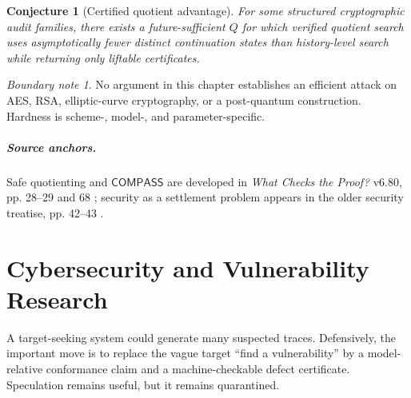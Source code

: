 \documentclass[11pt,oneside]{book}
\newtheorem{conjecture}[theorem]{Conjecture}
\theoremstyle{definition}
\theoremstyle{remark}
\newtheorem{boundary}[theorem]{Boundary note}
\newcommand{\COMPASS}{\mathsf{COMPASS}}
\begin{document}
\begin{conjecture}[Certified quotient advantage]
For some structured cryptographic audit families, there exists a future-sufficient \(Q\) for which
verified quotient search uses asymptotically fewer distinct continuation states than history-level
search while returning only liftable certificates.
\end{conjecture}

\begin{boundary}
No argument in this chapter establishes an efficient attack on AES, RSA, elliptic-curve cryptography,
or a post-quantum construction. Hardness is scheme-, model-, and parameter-specific.
\end{boundary}

\paragraph{Source anchors.} Safe quotienting and \(\COMPASS\) are developed in
\emph{What Checks the Proof?} v6.80, pp. 28--29 and 68 \cite{TennesonChecks}; security as a
settlement problem appears in the older security treatise, pp. 42--43 \cite{TennesonSecurity}.

\chapter{Cybersecurity and Vulnerability Research}
\label{ch:vulnerability}

A target-seeking system could generate many suspected traces. Defensively, the important move is to
replace the vague target ``find a vulnerability'' by a model-relative conformance claim and a
machine-checkable defect certificate. Speculation remains useful, but it remains quarantined.
\end{document}
